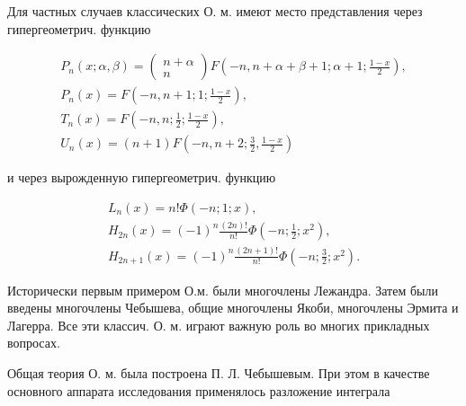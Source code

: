 \documentclass[10pt]{article}
\begin{document}
Для частных случаев классических О. м. имеют место представления через гипергеометрич. функцию



\[

\begin{gathered}

P_{n}(x ; \alpha, \beta)=\left(\begin{array}{c}

n+\alpha \\

n

\end{array}\right) F\left(-n, n+\alpha+\beta+1 ; \alpha+1 ; \frac{1-x}{2}\right), \\

P_{n}(x)=F\left(-n, n+1 ; 1 ; \frac{1-x}{2}\right), \\

T_{n}(x)=F\left(-n, n ; \frac{1}{2} ; \frac{1-x}{2}\right), \\

U_{n}(x)=(n+1) F\left(-n, n+2 ; \frac{3}{2}, \frac{1-x}{2}\right)

\end{gathered}

\]



и через вырожденную гипергеометрич. функцию



\[

\begin{gathered}

L_{n}(x)=n ! \Phi(-n ; 1 ; x), \\

H_{2 n}(x)=(-1)^{n} \frac{(2 n) !}{n !} \Phi\left(-n ; \frac{1}{2} ; x^{2}\right), \\

H_{2 n+1}(x)=(-1)^{n} \frac{(2 n+1) !}{n !} \Phi\left(-n ; \frac{3}{2} ; x^{2}\right) .

\end{gathered}

\]



Исторически первым примером О.м. были многочлены Лежандра. Затем были введены многочлены Чебышева, общие многочлены Якоби, многочлены Эрмита и Лагерра. Все эти классич. О. м. играют важную роль во многих прикладных вопросах.



Общая теория О. м. была построена П. Л. Чебышевым. При этом в качестве основного аппарата исследования применялось разложение интеграла
\end{document}
